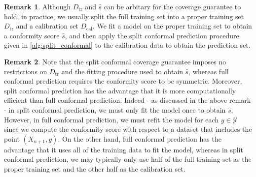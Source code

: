 \documentclass[11pt, titlepage]{article} %
\numberwithin{equation}{section}
\theoremstyle{definition}
\newtheorem{remark}{Remark}
\numberwithin{theorem}{section}
\numberwithin{lemma}{section}
\numberwithin{corollary}{section}
\numberwithin{proposition}{section}
\numberwithin{definition}{section}
\numberwithin{remark}{section}
\begin{document}
\begin{remark}
    Although \(D_\mathrm{tr}\) and \(\hat{s}\) can be arbitary for the coverage guarantee to hold, in practice, we usually split the full training set into a proper training set \(D_\mathrm{tr}\) and a calibration set \(D_\mathrm{cal}\). We fit a model on the proper training set to obtain a conformity score \(\hat{s}\), and then apply the split conformal prediction procedure given in \cref{alg:split_conformal} to the calibration data to obtain the prediction set.
\end{remark}

\begin{remark}
    Note that the split conformal coverage guarantee imposes no restrictions on \(D_\mathrm{tr}\) and the fitting procedure used to obtain \(\hat{s}\), whereas full conformal prediction requires the conformity score to be symmetric. Moreover, split conformal prediction has the advantage that it is more computationally efficient than full conformal prediction. Indeed - as discussed in the above remark - in split conformal prediction, we must only fit the model once to obtain \(\hat{s}\). However, in full conformal prediction, we must refit the model for each \(y \in \mathcal{Y}\) since we compute the conformity score with respect to a dataset that includes the point \((X_{n+1}, y)\). On the other hand, full conformal prediction has the advantage that it uses all of the training data to fit the model, whereas in split conformal prediction, we may typically only use half of the full training set as the proper training set and the other half as the calibration set.
\end{remark}
\end{document}
